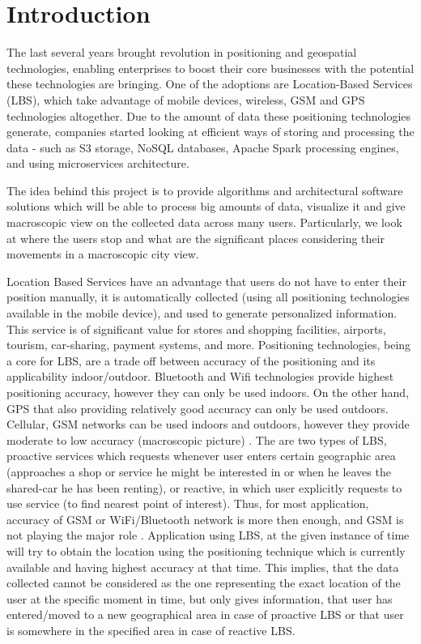 \chapter{Introduction}

The last several years brought revolution in positioning and geospatial technologies, enabling enterprises to boost their core businesses with the potential these technologies are bringing. One of the adoptions are Location-Based Services (LBS), which take advantage of mobile devices, wireless, GSM and GPS technologies altogether. Due to the amount of data these positioning technologies generate, companies started looking at efficient ways of storing and processing the data - such as S3 storage, NoSQL databases, Apache Spark processing engines, and using microservices architecture.

The idea behind this project is to provide algorithms and architectural software solutions which will be able to process big amounts of data, visualize it and give macroscopic view on the collected data across many users. Particularly, we look at where the users stop and what are the significant places considering their movements in a macroscopic city view. 

Location Based Services have an advantage that users do not have to enter their position manually, it is automatically collected (using all positioning technologies available in the mobile device), and used to generate personalized information. This service is of significant value for stores and shopping facilities, airports, tourism, car-sharing, payment systems, and more. Positioning technologies, being a core for LBS, are a trade off between accuracy of the positioning and its applicability indoor/outdoor. Bluetooth and Wifi technologies provide highest positioning accuracy, however they can only be used indoors. On the other hand, GPS that also providing relatively good accuracy can only be used outdoors. Cellular, GSM networks can be used indoors and outdoors, however they provide moderate to low accuracy (macroscopic picture) \cite{LocPos1}. The are two types of LBS, proactive services which requests whenever user enters certain geographic area (approaches a shop or service he might be interested in or when he leaves the shared-car he has been renting), or reactive, in which user explicitly requests to use service (to find nearest point of interest). Thus, for most application, accuracy of GSM or WiFi/Bluetooth network is more then enough, and GSM is not playing the major role \cite{LocPos2}. Application using LBS, at the given instance of time will try to obtain the location using the positioning technique which is currently available and having highest accuracy at that time. This implies, that the data collected cannot be considered as the one representing the exact location of the user at the specific moment in time, but only gives information, that user has entered/moved to a new geographical area in case of proactive LBS or that user is somewhere in the specified area in case of reactive LBS. 